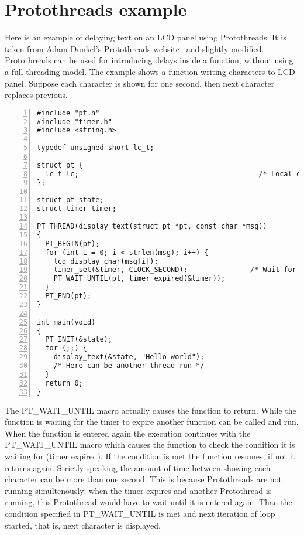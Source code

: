 

\chapter{Protothreads example}\label{app:protothreads}
Here is
an example of delaying text on an LCD panel using Protothreads.
It is taken from
Adam Dunkel's Protothreads website~\cite{adam-protothreads} and slightly modified.
Protothreads can be used for introducing delays inside a function, without using a full threading model.
The example shows a function writing characters to LCD panel.
Suppose each character is shown for one second, then next character replaces previous.
\begin{lstlisting}[numbers=left]
#include "pt.h"
#include "timer.h"
#include <string.h>

typedef unsigned short lc_t;

struct pt {
  lc_t lc;                                           /* Local continuation */
}; 

struct pt state;
struct timer timer;
 
PT_THREAD(display_text(struct pt *pt, const char *msg))
{
  PT_BEGIN(pt);
  for (int i = 0; i < strlen(msg); i++) {
    lcd_display_char(msg[i]);
    timer_set(&timer, CLOCK_SECOND);               /* Wait for one second. */
    PT_WAIT_UNTIL(pt, timer_expired(&timer));
  }
  PT_END(pt);
}

int main(void)
{
  PT_INIT(&state);
  for (;;) {
    display_text(&state, "Hello world");
    /* Here can be another thread run */
  }
  return 0;
}
\end{lstlisting}
The PT\_WAIT\_UNTIL macro actually causes the function to return.
While the function is waiting for the timer to expire another function can be called and run.
When the function is entered again the execution continues with the PT\_WAIT\_UNTIL macro
which causes the function to check the condition it is waiting for (timer expired).
If the condition is met the function resumes, if not it returns again.
Strictly speaking the amount of time between showing each character can
be more than one second.
This is because Protothreads are not running simultenously: when the timer expires
and another Protothread is running, this Protothread would have to wait until
it is entered again. Than the condition specified in PT\_WAIT\_UNTIL is met and
next iteration of loop started, that is, next character is displayed.


